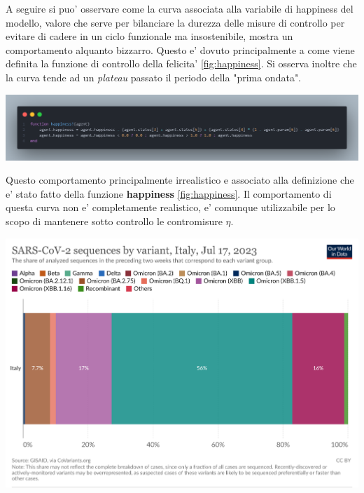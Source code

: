 A seguire si puo' osservare come la curva associata alla variabile di happiness del modello,
valore che serve per bilanciare la durezza delle misure di controllo per evitare 
di cadere in un ciclo funzionale ma insostenibile, mostra un comportamento alquanto bizzarro.
Questo e' dovuto principalmente a come viene definita la funzione di controllo della felicita' \ref{fig:happiness}.
Si osserva inoltre che la curva tende ad un \emph{plateau} passato il periodo della "prima ondata".

\begin{minipage}{\linewidth}
	\centering
	\includegraphics[width=\textwidth]{img/happiness.png}
	\label{fig:happiness}
\end{minipage}

Questo comportamento principalmente irrealistico e associato alla definizione che e' stato fatto della 
funzione \textbf{happiness} \ref{fig:happiness}. Il comportamento di questa curva non e' completamente 
realistico, e' comunque utilizzabile per lo scopo di mantenere sotto controllo le contromisure $\eta$.

\begin{minipage}{\linewidth}
	\centering
	\includegraphics[width=\textwidth]{img/coronavirus-data-explorer.png}
	\label{fig:covid_mutation}
\end{minipage}

